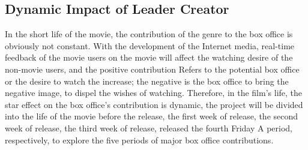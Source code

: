 \subsection{Dynamic Impact of Leader Creator}
In the short life of the movie, the contribution of the genre to the box office is obviously not constant. With the development of the Internet media, real-time feedback of the movie users on the movie will affect the watching desire of the non-movie users, and the positive contribution Refers to the potential box office or the desire to watch the increase; the negative is the box office to bring the negative image, to dispel the wishes of watching. Therefore, in the film's life, the star effect on the box office's contribution is dynamic, the project will be divided into the life of the movie before the release, the first week of release, the second week of release, the third week of release, released the fourth Friday A period, respectively, to explore the five periods of major box office contributions.